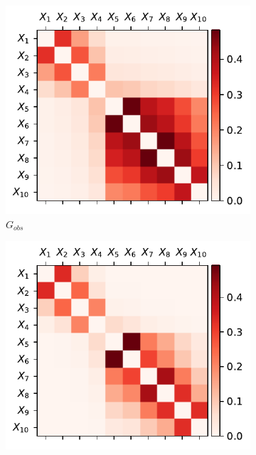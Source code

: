 \documentclass[../Thesis.tex]{subfiles}
\begin{document}
\begin{figure}[h]
    \centering
    \begin{subfigure}[t]{0.49\textwidth}
        \centering
        \includegraphics[width=.95\linewidth]{figures/Gaussian Chain Theoretical/symmetric G obs.pdf}
        \caption{$G_{obs}$}
    \end{subfigure}
    \hfill
    \begin{subfigure}[t]{0.49\textwidth}
        \centering
        \includegraphics[width=.95\linewidth]{figures/Gaussian Chain Theoretical/G dir from symmetric G obs.pdf}

\end{subfigure}
\end{figure}
\end{document}
